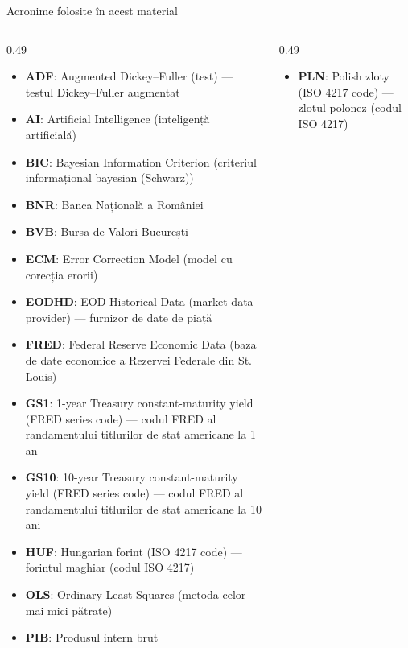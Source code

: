 {
\begin{frame}[noframenumbering]
    \titlepage
\end{frame}
}
\begin{frame}{Acronime folosite în acest material}
\begin{columns}[T]
\begin{column}{0.49\textwidth}
\begin{itemize}\setlength{\itemsep}{0pt}
    \item \textbf{ADF}: Augmented Dickey–Fuller (test) — testul Dickey–Fuller augmentat
    \item \textbf{AI}: Artificial Intelligence (inteligență artificială)
    \item \textbf{BIC}: Bayesian Information Criterion (criteriul informațional bayesian (Schwarz))
    \item \textbf{BNR}: Banca Națională a României
    \item \textbf{BVB}: Bursa de Valori București
    \item \textbf{ECM}: Error Correction Model (model cu corecția erorii)
    \item \textbf{EODHD}: EOD Historical Data (market-data provider) — furnizor de date de piață
    \item \textbf{FRED}: Federal Reserve Economic Data (baza de date economice a Rezervei Federale din St. Louis)
    \item \textbf{GS1}: 1-year Treasury constant-maturity yield (FRED series code) — codul FRED al randamentului titlurilor de stat americane la 1 an
    \item \textbf{GS10}: 10-year Treasury constant-maturity yield (FRED series code) — codul FRED al randamentului titlurilor de stat americane la 10 ani
    \item \textbf{HUF}: Hungarian forint (ISO 4217 code) — forintul maghiar (codul ISO 4217)
    \item \textbf{OLS}: Ordinary Least Squares (metoda celor mai mici pătrate)
    \item \textbf{PIB}: Produsul intern brut
\end{itemize}
\end{column}
\begin{column}{0.49\textwidth}
\begin{itemize}\setlength{\itemsep}{0pt}
    \item \textbf{PLN}: Polish zloty (ISO 4217 code) — zlotul polonez (codul ISO 4217)

\end{itemize}
\end{column}
\end{columns}
\end{frame}
